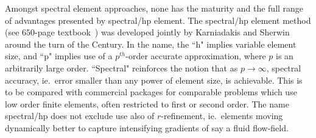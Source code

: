 Amongst spectral element approaches, none has the maturity and the full
range of advantages presented by spectral/hp element. The spectral/hp element method 
(see $650$-page textbook~\cite{karniadakissherwin}) was developed jointly by Karniadakis and Sherwin around the
turn of the Century. In the name, the ``h" implies variable element size, and
``p" implies use of a $p^{th}$-order accurate approximation, where $p$ is an arbitrarily large order.
``Spectral" reinforces the notion that as $p\longrightarrow\infty$, spectral accuracy, ie.\
error smaller than any power of element size, is achievable. This is to be compared with
commercial packages for comparable problems which use low order finite elements, often
restricted to first or second order.
The name spectral/hp does not exclude use also of $r$-refinement, ie.\ elements
moving dynamically better to capture intensifying gradients of say a fluid flow-field.


